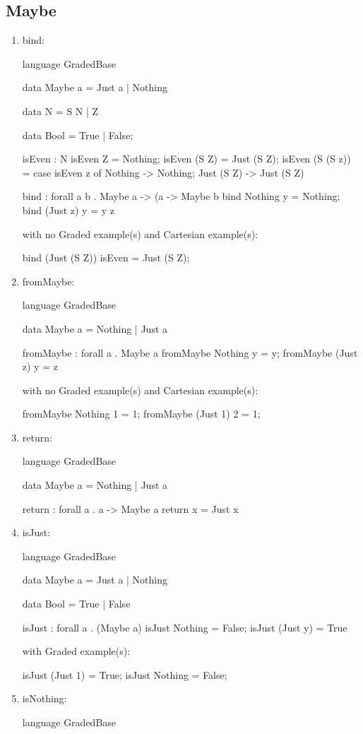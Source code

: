 \subsection{Maybe}
\begin{enumerate}
\item bind: 
\begin{granule}
language GradedBase

data Maybe a = Just a | Nothing

data N = S N | Z

data Bool = True | False; 

isEven : N %
isEven Z = Nothing;
isEven (S Z) = Just (S Z);
isEven (S (S z)) = 
    case isEven z of 
        Nothing -> Nothing;
        Just (S Z) -> Just (S Z)

bind : forall a b 
     . Maybe a %
     -> (a %
     -> Maybe b
bind Nothing y = Nothing;
bind (Just z) y = y z
\end{granule}
with no Graded example(s) and Cartesian example(s):
\begin{granule}
bind (Just (S Z)) isEven = Just (S Z);
\end{granule}
\item fromMaybe: 
\begin{granule}
language GradedBase

data Maybe a = Nothing | Just a

fromMaybe : forall a . Maybe a %
fromMaybe Nothing y = y;
fromMaybe (Just z) y = z
\end{granule}
with no Graded example(s) and Cartesian example(s):
\begin{granule}
fromMaybe  Nothing 1 = 1;
fromMaybe (Just 1) 2 = 1;
\end{granule}
\item return: 
\begin{granule}
language GradedBase

data Maybe a = Nothing | Just a

return : forall a . a -> Maybe a
return x = Just x
\end{granule}
\item isJust: 
\begin{granule}
language GradedBase

data Maybe a = Just a | Nothing 

data Bool = True | False 

isJust : forall a . (Maybe a) %
isJust Nothing = False;
isJust (Just y) = True
\end{granule}
with Graded example(s):
\begin{granule}
isJust (Just 1) = True;
isJust Nothing = False;
\end{granule}
\item isNothing: 
\begin{granule}
language GradedBase


\end{granule}
\end{enumerate}

